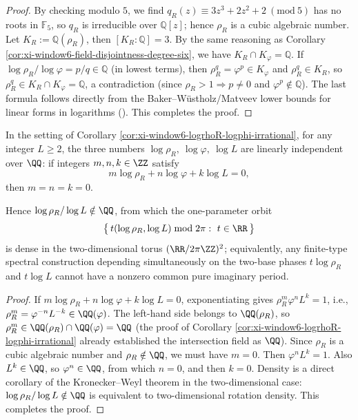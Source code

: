 \begin{proof}
By checking modulo \(5\), we find \(q_R(z)\equiv 3z^3+2z^2+2\ (\mathrm{mod}\ 5)\) has no roots in \(\mathbb F_5\), so \(q_R\) is irreducible over \(\mathbb Q[z]\); hence \(\rho_R\) is a cubic algebraic number.
Let \(K_R:=\mathbb Q(\rho_R)\), then \([K_R:\mathbb Q]=3\).
By the same reasoning as Corollary \ref{cor:xi-window6-field-disjointness-degree-six}, we have \(K_R\cap K_\varphi=\mathbb Q\).
If \(\log\rho_R/\log\varphi=p/q\in\mathbb Q\) (in lowest terms), then \(\rho_R^q=\varphi^{p}\in K_\varphi\) and \(\rho_R^q\in K_R\), so \(\rho_R^q\in K_R\cap K_\varphi=\mathbb Q\), a contradiction (since \(\rho_R>1\Rightarrow p\neq 0\) and \(\varphi^{p}\notin\mathbb Q\)).
The last formula follows directly from the Baker--W\"ustholz/Matveev lower bounds for linear forms in logarithms (\cite{BakerWustholz2007LogarithmicForms,Matveev2000LinearFormsLogs}). This completes the proof.
\end{proof}

\begin{corollary}\label{cor:xi-window6-logrhoR-logphi-logL-independent}
In the setting of Corollary \ref{cor:xi-window6-logrhoR-logphi-irrational}, for any integer \(L\ge 2\), the three numbers
\(
\log\rho_R,\ \log\varphi,\ \log L
\)
are linearly independent over \(\QQ\): if integers \(m,n,k\in\ZZ\) satisfy
\[
m\log\rho_R+n\log\varphi+k\log L=0,
\]
then \(m=n=k=0\).
\par
Hence \(\log\rho_R/\log L\notin\QQ\), from which the one-parameter orbit
\[
\bigl\{\,t(\log\rho_R,\log L)\bmod 2\pi:\ t\in\RR\,\bigr\}
\]
is dense in the two-dimensional torus \((\RR/2\pi\ZZ)^2\); equivalently, any finite-type spectral construction depending simultaneously on the two-base phases \(t\log\rho_R\) and \(t\log L\) cannot have a nonzero common pure imaginary period.
\end{corollary}
\begin{proof}
If \(m\log\rho_R+n\log\varphi+k\log L=0\), exponentiating gives
\(
\rho_R^{m}\varphi^{n}L^{k}=1
\), i.e.,
\(
\rho_R^{m}=\varphi^{-n}L^{-k}\in\QQ(\varphi)
\).
The left-hand side belongs to \(\QQ(\rho_R)\), so \(\rho_R^{m}\in \QQ(\rho_R)\cap\QQ(\varphi)=\QQ\) (the proof of Corollary \ref{cor:xi-window6-logrhoR-logphi-irrational} already established the intersection field as \(\QQ\)).
Since \(\rho_R\) is a cubic algebraic number and \(\rho_R\notin\QQ\), we must have \(m=0\).
Then \(\varphi^{n}L^{k}=1\). Also \(L^{k}\in\QQ\), so \(\varphi^{n}\in\QQ\), from which \(n=0\), and then \(k=0\).
Density is a direct corollary of the Kronecker--Weyl theorem in the two-dimensional case: \(\log\rho_R/\log L\notin\QQ\) is equivalent to two-dimensional rotation density. This completes the proof.
\end{proof}

